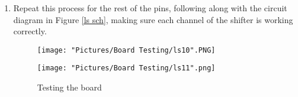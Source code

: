 \documentclass[12pt]{article}
\begin{document}
\begin{enumerate}
	\item Repeat this process for the rest of the pins, following along with the circuit diagram in Figure \ref{ls sch}, making sure each channel of the shifter is working correctly. 

\begin{figure}[H]
 	\centering
  	\begin{minipage}[b]{0.45\textwidth}
		\texttt{[image: "Pictures/Board Testing/ls10".PNG]}
  	\end{minipage}
  	\hfill
  	\begin{minipage}[b]{0.45\textwidth}
    		\texttt{[image: "Pictures/Board Testing/ls11".png]}
  	\end{minipage}
	\caption{Testing the board}
\end{figure}

\end{enumerate}
\end{document}
